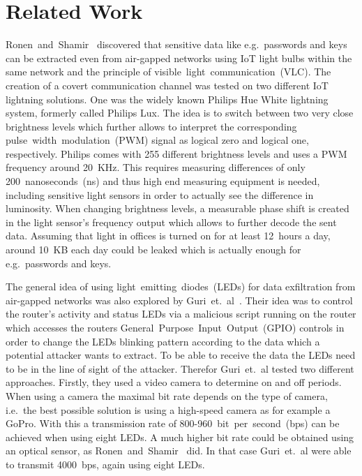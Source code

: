 \section{Related Work} %
\label{sec:related_work}


Ronen~and~Shamir~\cite{Ronen:2016:EFAIDCSL} discovered that sensitive data like e.g.\ passwords and keys can be extracted even from air-gapped networks using IoT light bulbs within the same network and the principle of visible~light~communication~(VLC). The creation of a covert communication channel was tested on two different IoT lightning solutions. One was the widely known Philips Hue White lightning system, formerly called Philips Lux. 
The idea is to switch between two very close brightness levels which further allows to interpret the corresponding pulse~width~modulation~(PWM) signal as logical zero and logical one, respectively. Philips comes with 255 different brightness levels and uses a PWM frequency around 20~KHz.
This requires measuring differences of only 200~nanoseconds~(ns) and thus high end measuring equipment is needed, including sensitive light sensors in order to actually see the difference in luminosity.
When changing brightness levels, a measurable phase shift is created in the light sensor's frequency output which allows to further decode the sent data.
Assuming that light in offices is turned on for at least 12~hours a day, around 10~KB each day could be leaked which is actually enough for e.g.\ passwords and keys.

The general idea of using light~emitting~diodes~(LEDs) for data exfiltration from air-gapped networks was also explored by Guri~et.~al~\cite{Guri:2017:xCDEANvRL}. Their idea was to control the router's activity and status LEDs via a malicious script running on the router which accesses the routers General~Purpose~Input~Output~(GPIO) controls in order to change the LEDs blinking pattern according to the data which a potential attacker wants to extract.
To be able to receive the data the LEDs need to be in the line of sight of the attacker. Therefor Guri~et.~al tested two different approaches. Firstly, they used a video camera to determine on and off periods. When using a camera the maximal bit rate depends on the type of camera, i.e.\ the best possible solution is using a high-speed camera as for example a GoPro. With this a transmission rate of 800-960~bit~per~second~(bps) can be achieved when using eight LEDs. A much higher bit rate could be obtained using an optical sensor, as Ronen~and~Shamir~\cite{Ronen:2016:EFAIDCSL} did. In that case Guri~et.~al were able to transmit 4000~bps, again using eight LEDs.

